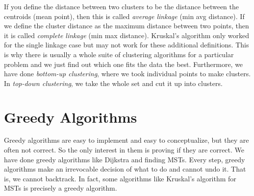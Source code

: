\documentclass{article}
\begin{document}
      If you define the distance between two clusters to be the distance between the centroids (mean point), then this is called \textit{average linkage} (min avg distance). If we define the cluster distance as the maximum distance between two points, then it is called \textit{complete linkage} (min max distance). Kruskal's algorithm only worked for the single linkage case but may not work for these additional definitions. This is why there is usually a whole suite of clustering algorithms for a particular problem and we just find out which one fits the data the best. Furthermore, we have done \textit{bottom-up clustering}, where we took individual points to make clusters. In \textit{top-down clustering}, we take the whole set and cut it up into clusters.  

\section{Greedy Algorithms}

  Greedy algorithms are easy to implement and easy to conceptualize, but they are often not correct. So the only interest in them is proving if they are correct. We have done greedy algorithms like Dijkstra and finding MSTs. Every step, greedy algorithms make an irrevocable decision of what to do and cannot undo it. That is, we cannot backtrack. In fact, some algorithms like Kruskal's algorithm for MSTs is precisely a greedy algorithm. 
  
\end{document}

